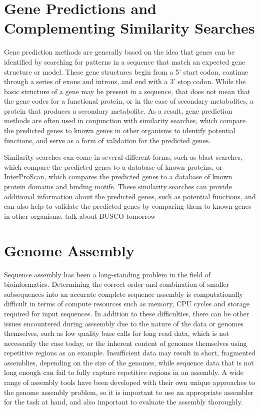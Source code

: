 \section{Gene Predictions and Complementing Similarity Searches}

Gene prediction methods are generally based on the idea that genes can be
identified by searching for patterns in a sequence that match an expected gene structure or model. These gene structures begin from a 5' start codon, continue through a series of exons and introns, and end with a 3' stop codon\cite{Loftus2003}. While the basic structure of a gene may be present in a sequence, that does not mean that the gene codes for a functional protein, or in the case of secondary metabolites, a protein that produces a secondary metabolite. As a result, gene prediction methods are often used in conjunction with similarity searches, which compare the predicted genes to known genes in other organisms to identify potential functions, and serve as a form of validation for the predicted genes\cite{Loftus2003}. 

Similarity searches can come in several different forms, such as blast searches, which compare the predicted genes to a database of known proteins, or InterProScan, which compares the predicted genes to a database of known protein domains and binding motifs\cite{Loftus2003}. These similarity searches can provide additional information about the predicted genes, such as potential functions, and can also help to validate the predicted genes by comparing them to known genes in other organisms. talk about BUSCO tomorrow  

\section{Genome Assembly}

Sequence assembly has been a long-standing problem in the field of
bioinformatics\cite{Nagarajan2013}. Determining the correct order and
combination of smaller subsequences into an accurate complete sequence
assembly is computationally difficult in terms of compute resources
such as memory, CPU cycles and storage required for input
sequences\cite{Nagarajan2013}. In addition to these difficulties,
there can be other issues encountered during asssembly due to the
nature of the data or genomes themselves, such as low quality base
calls for long read data, which is not necessarily the case today, or
the inherent content of genomes themselves using repetitive regions as
an example. Insufficient data may result in short, fragmented
assemblies, depending on the size of the genomes, while sequence data
that is not long enough can fail to fully capture repetitive regions
in an assembly. A wide range of assembly tools have been developed
with their own unique approaches to the genome assembly problem, so it
is important to use an appropriate assembler for the task at hand, and
also important to evaluate the assembly thoroughly.


